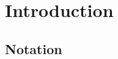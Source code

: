 \begin{abstract}
		
	\end{abstract}
	\maketitle
	\tableofcontents



\section{Introduction}


\subsection{Notation}

%


